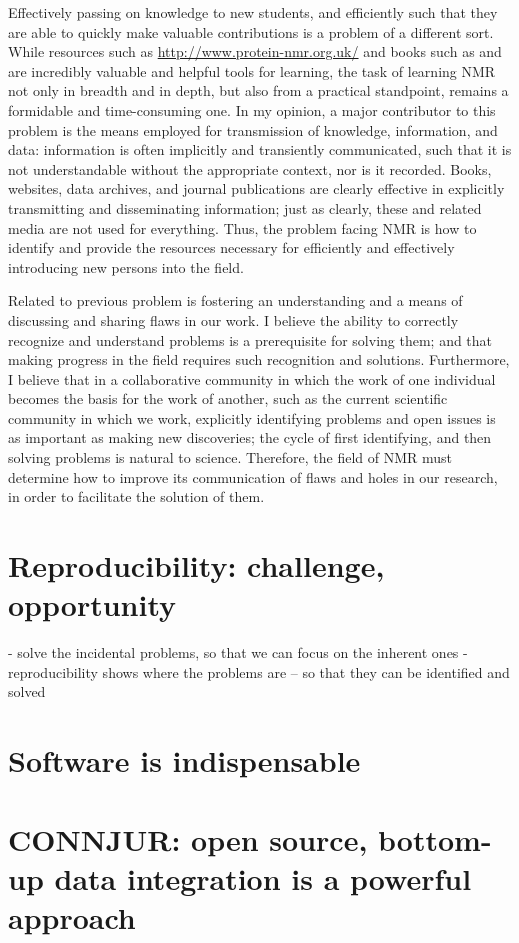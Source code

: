 Effectively passing on knowledge to new students, and efficiently such that
they are able to quickly make valuable contributions is a problem of a different
sort.  While resources such as \url{http://www.protein-nmr.org.uk/} and books
such as \cite{hoch1996nmr} and \cite{keeler2013} are incredibly valuable and
helpful tools for learning, the task of learning NMR not only in breadth and
in depth, but also from a practical standpoint, remains a formidable and
time-consuming one.  In my opinion, a major contributor to this problem is 
the means employed for transmission of knowledge, information, and data:
information is often implicitly and transiently communicated, such that it is
not understandable without the appropriate context, nor is it recorded.
Books, websites, data archives, and journal publications are clearly effective
in explicitly transmitting and disseminating information; just as clearly,
these and related media are not used for everything.  Thus, the problem facing
NMR is how to identify and provide the resources necessary for efficiently and
effectively introducing new persons into the field. 

Related to previous problem is fostering an understanding and a means of 
discussing and sharing flaws in our work.  I believe the ability to correctly
recognize and understand problems is a prerequisite for solving them; and that
making progress in the field requires such recognition and solutions.  
Furthermore, I believe that in a collaborative community in which the work of
one individual becomes the basis for the work of another, such as the current
scientific community in which we work, explicitly identifying problems and
open issues is as important as making new discoveries; the cycle of first
identifying, and then solving problems is natural to science.  Therefore, 
the field of NMR must determine how to improve its communication of flaws 
and holes in our research, in order to facilitate the solution of them.


\section{Reproducibility: challenge, opportunity}
 - solve the incidental problems, so that we can focus on the inherent ones
 - reproducibility shows where the problems are -- so that they can be identified and solved


\section{Software is indispensable}


\section{CONNJUR: open source, bottom-up data integration is a powerful approach}

